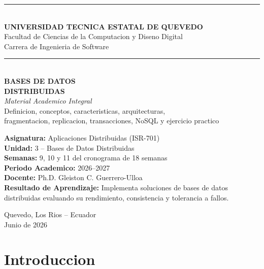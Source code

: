 \documentclass[11pt,a4paper]{article}
\begin{document}
\begin{titlepage}
\centering
\vspace*{1.2cm}
{\color{uteqBlue}\rule{\textwidth}{2pt}}\\[0.3cm]
{\LARGE\bfseries\color{uteqBlue} UNIVERSIDAD TECNICA ESTATAL DE QUEVEDO}\\[0.2cm]
{\large\color{uteqGray} Facultad de Ciencias de la Computacion y Diseno Digital}\\[0.1cm]
{\large\color{uteqGray} Carrera de Ingenieria de Software}\\
{\color{uteqBlue}\rule{\textwidth}{2pt}}\\[2.5cm]
{\Huge\bfseries\color{uteqBlue} BASES DE DATOS\\[0.4cm] DISTRIBUIDAS}\\[1cm]
{\Large\itshape\color{uteqMid} Material Academico Integral}\\[0.3cm]
{\large\color{uteqGray} Definicion, conceptos, caracteristicas, arquitecturas,\\ fragmentacion, replicacion, transacciones, NoSQL y ejercicio practico}\\[3cm]

\begin{tcolorbox}[colback=uteqLight,colframe=uteqBlue,width=0.85\textwidth,arc=4pt]
\centering
\textbf{Asignatura:} Aplicaciones Distribuidas (ISR-701)\\[0.2cm]
\textbf{Unidad:} 3 -- Bases de Datos Distribuidas\\[0.2cm]
\textbf{Semanas:} 9, 10 y 11 del cronograma de 18 semanas\\[0.2cm]
\textbf{Periodo Academico:} 2026--2027\\[0.2cm]
\textbf{Docente:} Ph.D. Gleiston C. Guerrero-Ulloa\\[0.2cm]
\textbf{Resultado de Aprendizaje:} Implementa soluciones de bases de datos distribuidas evaluando su rendimiento, consistencia y tolerancia a fallos.
\end{tcolorbox}

\vfill
{\small\color{uteqGray} Quevedo, Los Rios -- Ecuador \\ Junio de 2026}
\end{titlepage}

\tableofcontents
\newpage

\section{Introduccion}
\end{document}
